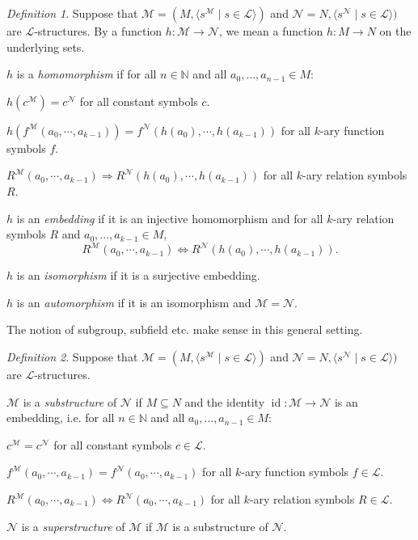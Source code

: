 \documentclass[a4paper, 11pt]{amsart}
\theoremstyle{remark}
\newtheorem{definition}[definition]{Definition}
\newcommand{\NN}{\mathbb{N}}
\DeclareMathOperator{\id}{id}
\newcommand{\cL}{\mathcal L}
\newcommand{\cM}{\mathcal M}
\newcommand{\cN}{\mathcal N}
\newenvironment{enumerate-(a)}{\begin{enumerate}[label={\upshape (\alph*)}, leftmargin=2pc]}{\end{enumerate}}
\newenvironment{enumerate-(1)}{\begin{enumerate}[label={\upshape (\arabic*)}, leftmargin=2pc]}{\end{enumerate}}
\begin{document}
\begin{definition} 
\label{definition homomorphism} 
Suppose that $\cM=(M, \langle s^\cM \mid s\in \cL\rangle)$ and $\cN= N, \langle s^\cN \mid s\in \cL\rangle)$ are $\cL$-structures. 
By a function $h\colon \cM\rightarrow \cN$, we mean a function $h\colon M\rightarrow N$ on the underlying sets. 
\begin{enumerate-(1)} 
\item 
$h$ is a \emph{homomorphism} if for all $n\in \NN$ and all $a_0,\dots,a_{n-1}\in M$: 
\begin{enumerate-(a)} 
\item 
$h(c^\cM)=c^\cN$ for all constant symbols $c$. 
\item 
$h(f^\cM(a_0,\cdots,a_{k-1}))=f^\cN(h(a_0),\cdots,h(a_{k-1}))$ for all $k$-ary function symbols $f$. 
\item 
$R^\cM(a_0,\cdots,a_{k-1}) \Longrightarrow R^\cN(h(a_0),\cdots,h(a_{k-1}))$ for all $k$-ary  relation symbols $R$. 
\end{enumerate-(a)} 
\item 
$h$ is an \emph{embedding} if it is an injective homomorphism and for all $k$-ary relation symbols $R$ and $a_0,\dots,a_{k-1}\in M$, 
$$ R^\cM(a_0,\cdots,a_{k-1}) \Longleftrightarrow  R^\cN(h(a_0),\cdots,h(a_{k-1})).$$ 
\item 
$h$ is an \emph{isomorphism} if it is a surjective embedding. 
\item 
$h$ is an \emph{automorphism} if it is an isomorphism and $\cM=\cN$. 
\end{enumerate-(1)} 
\end{definition} 



The notion of subgroup, subfield etc. make sense in this general setting. 

\begin{definition} 
\label{definition substructure} 
Suppose that $\cM=(M,\langle s^\cM\mid s\in \cL \rangle)$ and $\cN= N, \langle s^\cN \mid s\in \cL\rangle)$ are $\cL$-structures. 
\begin{enumerate-(1)} 
\item 
$\cM$ is  a \emph{substructure} of $\cN$ if $M\subseteq N$ and the identity $\id\colon \cM\rightarrow \cN$ is an embedding, i.e. for all $n\in \NN$ and all $a_0,\dots,a_{n-1}\in M$: 
\begin{enumerate-(a)} 
\item 
$c^\cM=c^\cN$ for all constant symbols $c\in \cL$. 
\item 
$f^\cM(a_0,\cdots,a_{k-1})=f^\cN(a_0,\cdots,a_{k-1})$ for all $k$-ary function symbols $f\in\cL$. 
\item 
$R^\cM(a_0,\cdots,a_{k-1}) \Longleftrightarrow R^\cN(a_0,\cdots,a_{k-1})$ for all $k$-ary  relation symbols $R\in\cL$. 
\end{enumerate-(a)} 


\item 
$\cN$ is a \emph{superstructure} of $\cM$ if $\cM$ is a substructure of $\cN$. 
\end{enumerate-(1)} 
\end{definition} 
\end{document}
